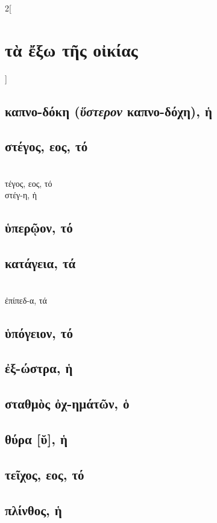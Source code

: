 \documentclass{book}
\begin{document}
\begin{multicols}{2}[\section{τὰ ἔξω τῆς οἰκίας}]
{\renewcommand \thesubsection {\thesection} }
\subsection{καπνο-δόκη (\textit{ὕστερον} καπνο-δόχη), ἡ}
\subsection{στέγος, εος, τό}
 ~\\
τέγος, εος, τό  ~\\
στέγ-η, ἡ 
\subsection{ὑπερῷον, τό}
\subsection{κατάγεια, τά}
 ~\\
ἐπίπεδ-α, τά 
\subsection{ὑπόγειον, τό}
\subsection{ἐξ-ώστρα, ἡ}
\subsection{σταθμὸς ὀχ-ημάτῶν, ὁ}
\subsection{θύρα [ῠ], ἡ}
\subsection{τεῖχος, εος, τό}
\subsection{πλίνθος, ἡ}

\end{multicols}
\end{document}
